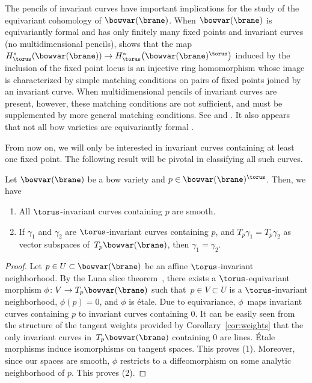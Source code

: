 The pencils of invariant curves have important implications for the study of the equivariant cohomology of $\bowvar(\brane)$. When $\bowvar(\brane)$ is equivariantly formal and has only finitely many fixed points and invariant curves (no multidimensional pencils), \cite{GKM} shows that the map $H^*_\torus (\bowvar(\brane)) \to H^*_\torus \bigl(\bowvar(\brane)^\torus\bigr)$ induced by the inclusion of the fixed point locus is an injective ring homomorphism whose image is characterized by simple matching conditions on pairs of fixed points joined by an invariant curve. When multidimensional pencils of invariant curves are present, however, these matching conditions are not sufficient, and must be supplemented by more general matching conditions. See \cite{CS} and \cite[Section~7.4]{equiv_coh}. It also appears that not all bow varieties are equivariantly formal \cite{yibo}.

From now on, we will only be interested in invariant curves containing at least one fixed point. The following result will be pivotal in classifying all such curves.

\begin{Proposition} \label{prop:equiv_geo}
Let $\bowvar(\brane)$ be a bow variety and $p \in \bowvar(\brane)^\torus$. Then, we have
\begin{enumerate}\itemsep=0pt
\item[$(1)$] All $\torus$-invariant curves containing $p$ are smooth.
\item[$(2)$] If $\gamma_1$ and $\gamma_2$ are $\torus$-invariant curves containing $p$, and $T_p\gamma_1=T_p\gamma_2$ as vector subspaces of~$T_p\bowvar(\brane)$, then $\gamma_1 = \gamma_2$.
\end{enumerate}
\end{Proposition}

\begin{proof}
Let $p\in U \subset \bowvar(\brane)$ be an affine $\torus$-invariant neighborhood. By the Luna slice theorem~\cite[Appendix of Chapter~1]{MFK}, there exists a $\torus$-equivariant morphism $\phi\colon V \to T_p \bowvar(\brane)$ such that~${p \in V \subset U}$ is a $\torus$-invariant neighborhood, $\phi(p) = 0$, and $\phi$ is \'etale. Due to equivariance, $\phi$~maps invariant curves containing $p$ to invariant curves containing $0$. It can be easily seen from the structure of the tangent weights provided by Corollary~\ref{cor:weights} that the only invariant curves in~$T_p\bowvar(\brane)$ containing $0$ are lines. \'Etale morphisms induce isomorphisms on tangent spaces. This proves (1). Moreover, since our spaces are smooth, $\phi$ restricts to a diffeomorphism on some analytic neighborhood of $p$. This proves (2).
\end{proof}

